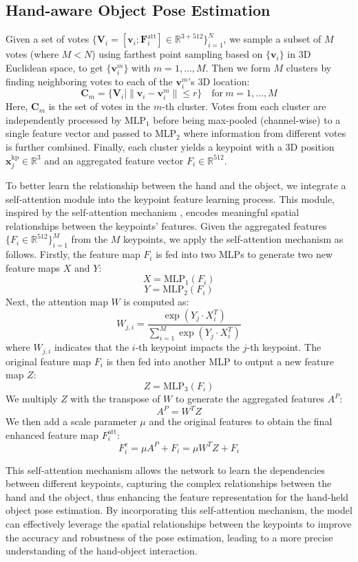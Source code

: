 \subsection{Hand-aware Object Pose Estimation}

Given a set of votes $\{\mathbf{V}_i = [\mathbf{v}_i; \mathbf{F}_i^{\text{att}}] \in \mathbb{R}^{3+512}\}_{i=1}^{N}$, we sample a subset of $M$ votes (where $M < N$) using farthest point sampling based on $\{\mathbf{v}_i\}$ in 3D Euclidean space, to get $\{\mathbf{v}_i^m\}$ with $m = 1, \ldots, M$. Then we form $M$ clusters by finding neighboring votes to each of the $\mathbf{v}_i^m$'s 3D location:
\[
\mathbf{C}_m = \{\mathbf{V}_i \mid \|\mathbf{v}_i - \mathbf{v}_i^m\| \leq r\} \quad \text{for} \ m = 1, \ldots, M
\]
Here, $\mathbf{C}_m$ is the set of votes in the $m$-th cluster. Votes from each cluster are independently processed by $\text{MLP}_1$ before being max-pooled (channel-wise) to a single feature vector and passed to $\text{MLP}_2$ where information from different votes is further combined. Finally, each cluster yields a keypoint with a 3D position $\mathbf{x}_{j}^{\text{kp}} \in \mathbb{R}^{3}$ and an aggregated feature vector $F_{i} \in \mathbb{R}^{512}$. 

To better learn the relationship between the hand and the object, we integrate a self-attention module into the keypoint feature learning process. This module, inspired by the self-attention mechanism \cite{zhang2019self}, encodes meaningful spatial relationships between the keypoints' features. Given the aggregated features $\{F_i \in \mathbb{R}^{512}\}_{i=1}^M$ from the $M$ keypoints, we apply the self-attention mechanism as follows. Firstly, the feature map $F_i$ is fed into two MLPs to generate two new feature maps $X$ and $Y$:
\[
X = \text{MLP}_1(F_i)
\]
\[
Y = \text{MLP}_2(F_i)
\]
Next, the attention map $W$ is computed as:
\[
W_{j,i} = \frac{\exp(Y_j \cdot X_i^T)}{\sum_{i=1}^{M} \exp(Y_j \cdot X_i^T)}
\]
where $W_{j,i}$ indicates that the $i$-th keypoint impacts the $j$-th keypoint. The original feature map $F_i$ is then fed into another MLP to output a new feature map $Z$:
\[
Z = \text{MLP}_3(F_i)
\]
We multiply $Z$ with the transpose of $W$ to generate the aggregated features $A^P$:
\[
A^P = W^T Z
\]
We then add a scale parameter $\mu$ and the original features to obtain the final enhanced feature map $F_i^{\text{att}}$:
\[
F_i^{\text{e}} = \mu A^P + F_i = \mu W^T Z + F_i
\]

This self-attention mechanism allows the network to learn the dependencies between different keypoints, capturing the complex relationships between the hand and the object, thus enhancing the feature representation for the hand-held object pose estimation. By incorporating this self-attention mechanism, the model can effectively leverage the spatial relationships between the keypoints to improve the accuracy and robustness of the pose estimation, leading to a more precise understanding of the hand-object interaction.

